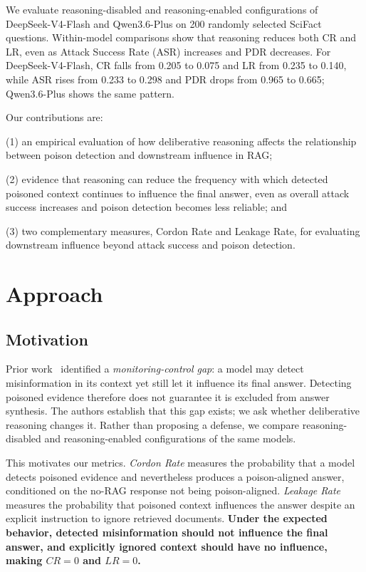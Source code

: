 \documentclass[11pt]{article}
\begin{document}
We evaluate reasoning-disabled and reasoning-enabled configurations of DeepSeek-V4-Flash and Qwen3.6-Plus on 200 randomly selected SciFact questions. Within-model comparisons show that reasoning reduces both CR and LR, even as Attack Success Rate (ASR) increases and PDR decreases. For DeepSeek-V4-Flash, CR falls from 0.205 to 0.075 and LR from 0.235 to 0.140, while ASR rises from 0.233 to 0.298 and PDR drops from 0.965 to 0.665; Qwen3.6-Plus shows the same pattern.

Our contributions are:

(1) an empirical evaluation of how deliberative reasoning affects the relationship between poison detection and downstream influence in RAG;

(2) evidence that reasoning can reduce the frequency with which detected poisoned context continues to influence the final answer, even as overall attack success increases and poison detection becomes less reliable; and

(3) two complementary measures, Cordon Rate and Leakage Rate, for evaluating downstream influence beyond attack success and poison detection.


\section{Approach}

\subsection{Motivation}
Prior work~\cite{yu2026detectingresolvingmonitoringcontrol} identified a \emph{monitoring-control gap}: a model may detect misinformation in its context yet still let it influence its final answer. Detecting poisoned evidence therefore does not guarantee it is excluded from answer synthesis. The authors establish that this gap exists; we ask whether deliberative reasoning changes it. Rather than proposing a defense, we compare reasoning-disabled and reasoning-enabled configurations of the same models.

This motivates our metrics. \emph{Cordon Rate} measures the probability that a model detects poisoned evidence and nevertheless produces a poison-aligned answer, conditioned on the no-RAG response not being poison-aligned. \emph{Leakage Rate} measures the probability that poisoned context influences the answer despite an explicit instruction to ignore retrieved documents. \textbf{Under the expected behavior, detected misinformation should not influence the final answer, and explicitly ignored context should have no influence, making \(CR=0\) and \(LR=0\).}
\end{document}
